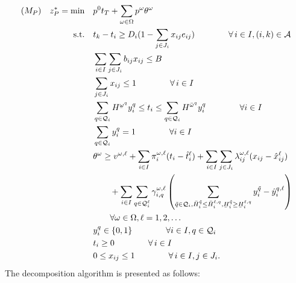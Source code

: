 \documentclass[11pt]{article}
\renewcommand{\underbar}{\underaccent{\bar}}
\begin{document}
	\begin{subequations} \label{prob:masterTightened}
		\begin{align}
		(M_P) \quad z_P^* = \min \quad &p^0 t_T + \sum_{\omega \in \Omega} p^\omega \theta^{\omega}\\
		\text{s.t.} \quad & t_k - t_i \geq D_{i}(1 - \sum_{j \in J_i} x_{ij} e_{ij}) \qquad \qquad \forall \,i \in I, (i,k) \in \mathcal{A} \label{cons:MpSep}\\
		& \sum_{i \in I} \sum_{j \in J_i} b_{ij}x_{ij} \leq B  \label{cons:MpBudget}\\
		& \sum_{j \in J_i} x_{ij} \leq 1  \qquad \qquad \forall \,i \in I \label{cons:MpSingleBudget}\\
		& \sum_{q \in \mathcal{Q}_i} H^{\underbar{\omega}^q} y_i^{q} \leq t_i \leq \sum_{q \in \mathcal{Q}_i} H^{\bar{\omega}^q} y_i^{q} \qquad \qquad \forall i \in I\\
		& \sum_{q \in \mathcal{Q}_i} y^q_i = 1 \qquad \qquad \forall i \in I \\
		& \theta^\omega \geq v^{\omega,\ell} + \sum_{i \in I} \pi_i^{\omega,\ell} (t_i - \hat{t}_i^{\ell}) + \sum_{i \in I} \sum_{j \in J_i} \lambda_{ij}^{\omega,\ell} (x_{ij} - \hat{x}_{ij}^{\ell}) \nonumber \\
		&\qquad + \sum_{i \in I} \sum_{q \in \mathcal{Q}^{\ell}_i} \gamma_{i,q}^{\omega,\ell} \left( \sum_{\tilde{q} \in \mathcal{Q}_i, \bar{H}_i^{\tilde{q}} \leq \bar{H}_i^{\ell,q},\underbar{H}_i^{\tilde{q}} \geq \underbar{H}_i^{\ell,q} }y_i^{\tilde{q}} - \hat{y}_i^{q,\ell} \right) \nonumber \\
		& \qquad  \forall \omega \in \Omega, \ell = 1, 2, \dots\\
		& y_i^q \in \{0,1\} \qquad \qquad \forall i \in I, q \in \mathcal{Q}_i\\
		& t_i \geq 0 \qquad \qquad \forall \,i \in I\\
		& 0 \leq x_{ij} \leq 1 \qquad \qquad \forall \,i \in I, j \in J_i.
		\end{align}
	\end{subequations}
	The decomposition algorithm is presented as follows:
\end{document}
